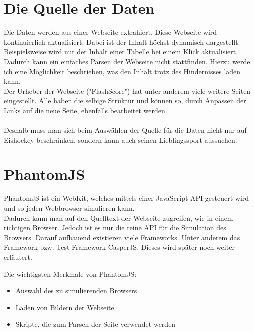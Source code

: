 \chapter{Die Quelle der Daten}
Die Daten werden aus einer Webseite \cite{Daten} extrahiert. Diese Webseite wird kontinuierlich aktualisiert. Dabei ist der Inhalt h\"ochst dynamisch dargestellt. Beispielsweise wird nur der Inhalt einer Tabelle bei einem Klick aktualisiert.\\
Dadurch kann ein einfaches Parsen der Webseite nicht stattfinden.
Hierzu werde ich eine M\"oglichkeit beschrieben, was den Inhalt trotz des Hindernisses laden kann.
\\
Der Urheber der Webseite ("FlashScore") hat unter anderem viele weitere Seiten eingestellt. 
Alle haben die selbige Struktur und k\"onnen so, durch Anpassen der Links auf die neue Seite, ebenfalls bearbeitet werden.\\
\\
Deshalb muss man sich beim Ausw\"ahlen der Quelle f\"ur die Daten nicht nur auf Eishockey beschr\"anken, sondern kann auch seinen Lieblingssport aussuchen.


\chapter{PhantomJS}
PhantomJS \cite{Webkit} ist ein WebKit, welches mittels einer JavaScript API gesteuert wird und so jeden Webbrowser simulieren kann.\\
Dadurch kann man auf den Quelltext der Webseite zugreifen, wie in einem richtigen Browser.
Jedoch ist es nur die reine API f\"ur die Simulation des Browsers. 
Darauf aufbauend existieren viele Frameworks.
Unter anderem das Framework bzw. Test-Framework CasperJS.
Dieses wird sp\"ater noch weiter erl\"autert.

Die wichtigsten Merkmale von PhantomJS:
\begin{itemize}
\item Auswahl des zu simulierenden Browsers
\item Laden von Bildern der Webseite
\item Skripte, die zum Parsen der Seite verwendet werden
\end{itemize}
\newpage

